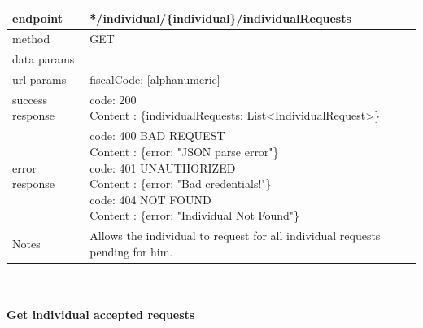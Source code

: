 \begin{legal}
\begin{legal}
\begin{itemize}
								\begin{tabularx}{\linewidth}{| l| l }
									\hline
									endpoint & */individual/\{individual\}/individualRequests \\
									\hline
									method & GET \\
									\hline
									data params & \\
									\hline
									url params &
									\parbox{0.7\textwidth}{
										\bigskip
										fiscalCode: [alphanumeric]
										\bigskip
									} \\
									\hline
									success response &
									\parbox{0.7\textwidth}{
										\bigskip
										code: 200\\
										Content : \{individualRequests: List<IndividualRequest>\}
										\bigskip
									} \\
									\hline
									error response &
									\parbox{0.7\textwidth}{
										\bigskip
										code: 400 BAD REQUEST \\
										Content : \{error: "JSON parse error"\}\\
										code: 401 UNAUTHORIZED \\
										Content : \{error: "Bad credentials!"\}\\
										code: 404 NOT FOUND \\
										Content : \{error: "Individual Not Found"\}
										\bigskip
									} \\
									\hline
									Notes & 
									\parbox{0.7\textwidth}{
										\bigskip Allows the individual to request for all individual requests pending for him.
									\bigskip}  \\
									\hline
								\end{tabularx}\\\\
								
								\textbf{Get individual accepted requests} \\
			

\end{itemize}
\end{legal}
\end{legal}
